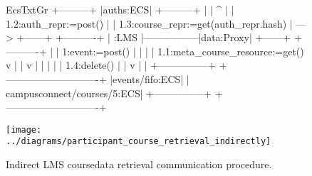 \begin{figure}[p]
\noindent \begin{centering}
\begin{SaveVerbatim}{EcsTxtGr}
                  +---------+                                  
                  |auths:ECS|                                  
                  +---------+                                  
                       |                                       
                       | ^                                     
                       | | 1.2:auth_repr:=post()               
                       |                                       
                       |   1.3:course_repr:=get(auth_repr.hash)
                       |    ---> 
                   +------+                 +----------+       
                   | :LMS |-----------------|data:Proxy|       
                   +------+                 +----------+       
                     |   |                                     
   1:event:=post() | |   |  | 1.1:meta_course_resource:=get()  
                   v |   |  v                                  
                     |   |                                     
                     |   |  | 1.4:delete()                     
                     |   |  v                                  
                     |   |                                     
      +---------------+ +----------------------------+         
      |events/fifo:ECS| | campusconnect/courses/5:ECS|         
      +---------------+ +----------------------------+         

\end{SaveVerbatim}
%
  {}%
  {\texttt{[image: ../diagrams/participant\_course\_retrieval\_indirectly]}}
\par\end{centering}
\caption[Indirect LMS coursedata
retrieval]{\label{fig:participant_coursedata_retrieval_indirectly}Indirect LMS
coursedata retrieval communication procedure.}
\end{figure}
